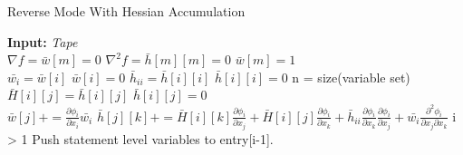 \documentclass[oneside]{article}
\begin{document}
\begin{algorithm*}[!htb]
  \caption{Reverse Mode With Hessian Accumulation}
  \begin{algorithmic}[1]
\State \textbf{Input:} \textit{Tape} \\
\State $\nabla f = \bar{w}[m] = 0$ 
\State $\nabla^2 f =  \bar{h}[m][m] = 0$ 
\State $\bar{w}[m] = 1$ \\
\State $\bar{w_i}=\bar{w}[i]$
\State $\bar{w}[i] = 0$
\State $\bar{h}_{ii}=\bar{h}[i][i]$
\State $\bar{h}[i][i] = 0$
\State n = size(variable set) \\
\State $\bar{H}[i][j] = \bar{h}[i][j]$
\State $\bar{h}[i][j] = 0$
\EndFor \\
\State $\bar{w}[j] +=  \frac{\partial \phi_i}{\partial x_i}\bar{w_i}$
\State  $\bar{h}[j][k] += \bar{H}[i][k]  \frac{\partial  \phi_i}{\partial x_j} + \bar{H}[i][j]  \frac{\partial  \phi_i}{\partial x_k}+\bar{h}_{ii}\frac{\partial  \phi_i}{\partial x_k} \frac{\partial  \phi_i}{\partial x_j} + \bar{w_i}\frac{\partial^2  \phi_i}{\partial x_j \partial x_k}$
\EndFor
\EndFor
\If i > 1
\State Push statement level variables to entry[i-1].

\end{algorithmic}
\end{algorithm*}
\end{document}
